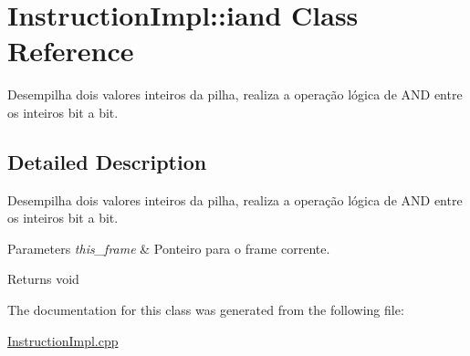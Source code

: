 \hypertarget{class_instruction_impl_1_1iand}{}\section{Instruction\+Impl\+:\+:iand Class Reference}
\label{class_instruction_impl_1_1iand}


Desempilha dois valores inteiros da pilha, realiza a operação lógica de A\+ND entre os inteiros bit a bit.  




\subsection{Detailed Description}
Desempilha dois valores inteiros da pilha, realiza a operação lógica de A\+ND entre os inteiros bit a bit. 


\begin{DoxyParams}{Parameters}
{\em this\+\_\+frame} & Ponteiro para o frame corrente. \\
\hline
\end{DoxyParams}
\begin{DoxyReturn}{Returns}
void 
\end{DoxyReturn}


The documentation for this class was generated from the following file\+:\begin{DoxyCompactItemize}
\item 
\hyperlink{_instruction_impl_8cpp}{Instruction\+Impl.\+cpp}\end{DoxyCompactItemize}
